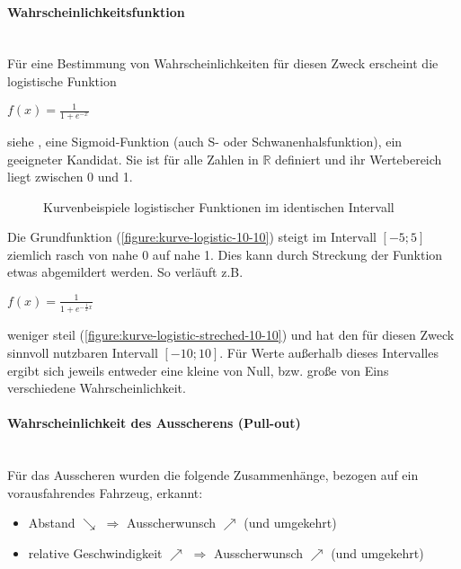 \paragraph*{Wahrscheinlichkeitsfunktion} 
\hfill \\
Für eine Bestimmung von Wahrscheinlichkeiten für diesen Zweck erscheint die logistische Funktion  
\begin{center}
$ f(x) = \frac{1}{1 + e^{-x}} $ 
\end{center}
siehe \cite{logistic-function}, eine Sigmoid-Funktion (auch S- oder Schwanenhalsfunktion), ein geeigneter Kandidat. 
Sie ist für alle Zahlen in $ \mathbb{R} $ definiert und ihr Wertebereich liegt zwischen 0 und 1.

\begin{figure}[hptb]
  \centering
     \qquad 
  \caption[Kurvenbeispiele der logistischen Funktion]
          {Kurvenbeispiele logistischer Funktionen im identischen Intervall}
  \label{figure:kurve-logistic}
\end{figure}

\noindent
Die Grundfunktion (\cref{figure:kurve-logistic-10-10}) steigt im Intervall $ [-5; 5] $ ziemlich rasch von nahe 0 auf nahe 1.
Dies kann durch Streckung der Funktion etwas abgemildert werden.
So verläuft z.B. 
\begin{center}
$ f(x) = \frac{1}{1 + e^{-\frac{1}{2}x}} $ 
\end{center}
weniger steil (\cref{figure:kurve-logistic-streched-10-10}) und hat den für diesen Zweck sinnvoll nutzbaren Intervall $ [-10; 10 ] $.
Für Werte außerhalb dieses Intervalles ergibt sich jeweils entweder eine kleine von Null, bzw. große von Eins verschiedene Wahrscheinlichkeit.

\paragraph*{Wahrscheinlichkeit des Ausscherens (Pull-out)} 
\hfill \\
Für das Ausscheren wurden die folgende Zusammenhänge, bezogen auf ein vorausfahrendes Fahrzeug, erkannt:
\begin{itemize}
    \itemsep0em
    \item Abstand $ \searrow $  $ \Longrightarrow $ Ausscherwunsch $ \nearrow $ (und umgekehrt)
    \item relative Geschwindigkeit $ \nearrow $ $ \Longrightarrow $ Ausscherwunsch $ \nearrow $ (und umgekehrt)
\end{itemize}

